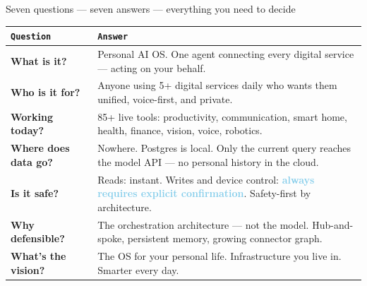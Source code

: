 \documentclass[aspectratio=169, 10pt]{beamer}
\newcommand{\hl}[1]{\textcolor{skyblue}{\textbf{#1}}}
\begin{document}
\begin{frame}{Seven questions — seven answers — everything you need to decide}
  \small
  \setlength{\tabcolsep}{8pt}
  \renewcommand{\arraystretch}{1.38}
  \begin{tabularx}{\textwidth}{>{\bfseries\color{skyblue}}p{2.8cm} X}
    \arrayrulecolor{accentcol!20}
    \toprule
    {\normalfont\color{dimcol}\texttt{Question}} &
    {\normalfont\color{dimcol}\texttt{Answer}} \\
    \midrule
    What is it? &
      Personal AI OS. One agent connecting every digital service — acting on your behalf. \\
    Who is it for? &
      Anyone using 5+ digital services daily who wants them unified, voice-first, and private. \\
    Working today? &
      85+ live tools: productivity, communication, smart home, health, finance, vision, voice, robotics. \\
    Where does data go? &
      Nowhere. Postgres is local. Only the current query reaches the model API — no personal history in the cloud. \\
    Is it safe? &
      Reads: instant. Writes and device control: \hl{always requires explicit confirmation}. Safety-first by architecture. \\
    Why defensible? &
      The orchestration architecture — not the model. Hub-and-spoke, persistent memory, growing connector graph. \\
    What's the vision? &
      The OS for your personal life. Infrastructure you live in. Smarter every day. \\
    \bottomrule
  \end{tabularx}
\end{frame}
\end{document}

